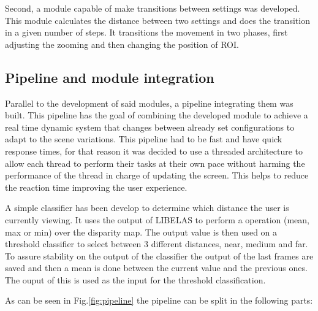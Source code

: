 \documentclass[10pt,a4paper,twocolumn,twoside]{article}
\begin{document}
	Second, a module capable of make transitions between settings was developed. This module calculates the distance between two settings and does the transition in a given number of steps. It transitions the movement in two phases, first adjusting the zooming and then changing the position of ROI.
	
	\subsection{Pipeline and module integration}
	\label{sec:pipeline}
	
	Parallel to the development of said modules, a pipeline integrating them was built. This pipeline has the goal of combining the developed module to achieve a real time dynamic system that changes between already set configurations to adapt to the scene variations. This pipeline had to be fast and have quick response times, for that reason it was decided to use a threaded architecture to allow each thread to perform their tasks at their own pace without harming the performance of the thread in charge of updating the screen. This helps to reduce the reaction time improving the user experience. 
	
	A simple classifier has been develop to determine which distance the user is currently viewing. It uses the output of LIBELAS to perform a operation (mean, max or min) over the disparity map. The output value is then used on a threshold classifier to select between 3 different distances, near, medium and far. 
	To assure stability on the output of the classifier the output of the last frames are saved and then a mean is done between the current value and the previous ones. The ouput of this  is used as the input for the threshold classification. 
	
	As can be seen in Fig.\ref{fig:pipeline} the pipeline can be split in the following parts: 
	
\end{document}
